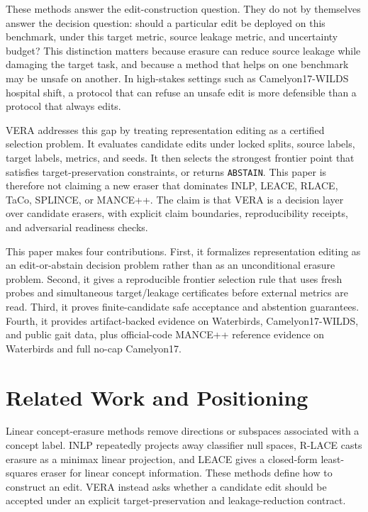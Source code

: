\documentclass[10pt]{article}
\begin{document}
These methods answer the edit-construction question. They do not by themselves
answer the decision question: should a particular edit be deployed on this
benchmark, under this target metric, source leakage metric, and uncertainty
budget? This distinction matters because erasure can reduce source leakage
while damaging the target task, and because a method that helps on one
benchmark may be unsafe on another. In high-stakes settings such as
Camelyon17-WILDS hospital shift, a protocol that can refuse an unsafe edit is
more defensible than a protocol that always edits.

VERA addresses this gap by treating representation editing as a certified
selection problem. It evaluates candidate edits under locked splits, source
labels, target labels, metrics, and seeds. It then selects the strongest
frontier point that satisfies target-preservation constraints, or returns
\texttt{ABSTAIN}. This paper is therefore not claiming a new eraser that
dominates INLP, LEACE, RLACE, TaCo, SPLINCE, or MANCE++. The claim is that
VERA is a decision layer over candidate erasers, with explicit claim
boundaries, reproducibility receipts, and adversarial readiness checks.

This paper makes four contributions. First, it formalizes representation
editing as an edit-or-abstain decision problem rather than as an unconditional
erasure problem. Second, it gives a reproducible frontier selection rule that
uses fresh probes and simultaneous target/leakage certificates before external
metrics are read. Third, it proves finite-candidate safe acceptance and
abstention guarantees. Fourth, it provides artifact-backed evidence on
Waterbirds, Camelyon17-WILDS, and public gait data, plus official-code MANCE++
reference evidence on Waterbirds and full no-cap Camelyon17.

\section{Related Work and Positioning}

Linear concept-erasure methods remove directions or subspaces associated with a
concept label. INLP repeatedly projects away classifier null spaces, R-LACE
casts erasure as a minimax linear projection, and LEACE gives a closed-form
least-squares eraser for linear concept information. These methods define how
to construct an edit. VERA instead asks whether a candidate edit should be
accepted under an explicit target-preservation and leakage-reduction contract.
\end{document}

